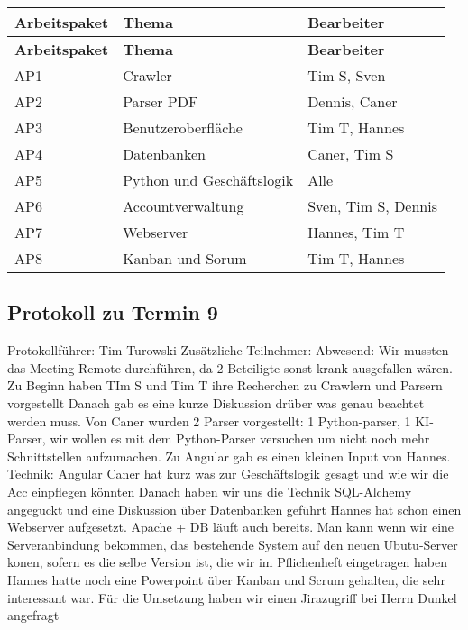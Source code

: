 \begin{flushleft}
	\begin{longtable}{p{4cm}p{10cm}p{3cm}}
		\toprule
		\textbf{Arbeitspaket} & \textbf{Thema} & \textbf{Bearbeiter}\\
		\midrule\endfirsthead
		\toprule
		\textbf{Arbeitspaket} & \textbf{Thema} & \textbf{Bearbeiter}\\
\midrule\endfirsthead
		AP1 & Crawler &  Tim S, Sven\\ \midrule
		AP2& Parser PDF &  Dennis, Caner\\ \midrule
		AP3 & Benutzeroberfläche & Tim T, Hannes\\ \midrule
		AP4 & Datenbanken & Caner, Tim S\\ \midrule
		AP5 & Python und Geschäftslogik &  Alle\\ \midrule
		AP6 & Accountverwaltung &  Sven, Tim S, Dennis\\ \midrule
		AP7 & Webserver & Hannes, Tim T\\ \midrule
		AP8 & Kanban und Sorum & Tim T, Hannes\\
		\bottomrule
	\end{longtable}
\end{flushleft}

\subsection{Protokoll zu Termin 9}
Protokollführer: Tim Turowski\newline
Zusätzliche Teilnehmer:  \newline
Abwesend: \newline \newline
Wir mussten das Meeting Remote durchführen, da 2 Beteiligte sonst krank ausgefallen wären.\newline
Zu Beginn haben TIm S und Tim T ihre Recherchen zu Crawlern und Parsern vorgestellt \newline
Danach gab es eine kurze Diskussion drüber was genau beachtet werden muss.\newline
Von Caner wurden 2 Parser vorgestellt: 1 Python-parser, 1 KI-Parser, wir wollen es mit dem Python-Parser versuchen um nicht noch mehr Schnittstellen aufzumachen.\newline
Zu Angular gab es einen kleinen Input von Hannes. Technik: Angular\newline
Caner hat kurz was zur Geschäftslogik gesagt und wie wir die Acc einpflegen könnten \newline
Danach haben wir uns die Technik SQL-Alchemy angeguckt und eine Diskussion über Datenbanken geführt \newline
Hannes hat schon einen Webserver aufgesetzt. Apache + DB läuft auch bereits. Man kann wenn wir eine Serveranbindung bekommen, das bestehende System auf den neuen Ubutu-Server konen, sofern es die selbe Version ist, die wir im Pflichenheft eingetragen haben\newline
Hannes hatte noch eine Powerpoint über Kanban und Scrum gehalten, die sehr interessant war. Für die Umsetzung haben wir einen Jirazugriff bei Herrn Dunkel angefragt\newline